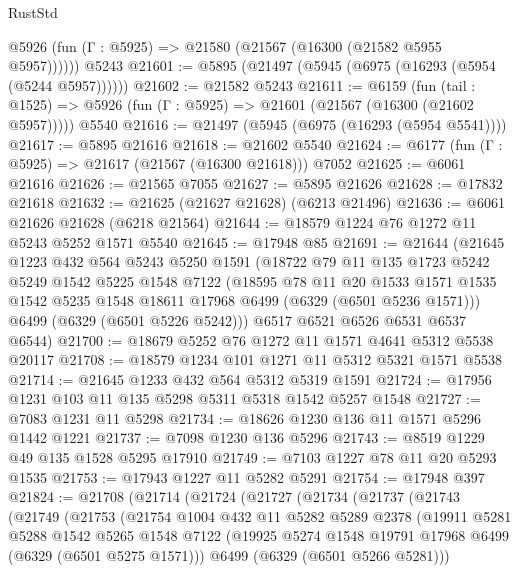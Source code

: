 \begin{lexlean}{RustStd}
\begin{coremodule}
{{      @5926 (fun (Γ : @5925) => @21580 (@21567 (@16300 (@21582 @5955 @5957))))))
    @5243
@21601 := @5895 (@21497 (@5945 (@6975 (@16293 (@5954 (@5244 @5957))))))
@21602 := @21582 @5243
@21611 := @6159
    (fun (tail : @1525) => @5926 (fun (Γ : @5925) => @21601 (@21567 (@16300 (@21602 @5957)))))
    @5540
@21616 := @21497 (@5945 (@6975 (@16293 (@5954 @5541))))
@21617 := @5895 @21616
@21618 := @21602 @5540
@21624 := @6177 (fun (Γ : @5925) => @21617 (@21567 (@16300 @21618))) @7052
@21625 := @6061 @21616
@21626 := @21565 @7055
@21627 := @5895 @21626
@21628 := @17832 @21618
@21632 := @21625 (@21627 @21628) (@6213 @21496)
@21636 := @6061 @21626 @21628 (@6218 @21564)
@21644 := @18579 @1224 @76 @1272 @11 @5243 @5252 @1571 @5540
@21645 := @17948 @85
@21691 := @21644
    (@21645
      @1223
      @432
      @564
      @5243
      @5250
      @1591
      (@18722
        @79
        @11
        @135
        @1723
        @5242
        @5249
        @1542
        @5225
        @1548
        @7122
        (@18595
          @78
          @11
          @20
          @1533
          @1571
          @1535
          @1542
          @5235
          @1548
          @18611
          @17968
          @6499
          (@6329 (@6501 @5236 @1571)))
        @6499
        (@6329 (@6501 @5226 @5242)))
      @6517
      @6521
      @6526
      @6531
      @6537
      @6544)
@21700 := @18679 @5252 @76 @1272 @11 @1571 @4641 @5312 @5538 @20117
@21708 := @18579 @1234 @101 @1271 @11 @5312 @5321 @1571 @5538
@21714 := @21645 @1233 @432 @564 @5312 @5319 @1591
@21724 := @17956 @1231 @103 @11 @135 @5298 @5311 @5318 @1542 @5257 @1548
@21727 := @7083 @1231 @11 @5298
@21734 := @18626 @1230 @136 @11 @1571 @5296 @1442 @1221
@21737 := @7098 @1230 @136 @5296
@21743 := @8519 @1229 @49 @135 @1528 @5295 @17910
@21749 := @7103 @1227 @78 @11 @20 @5293 @1535
@21753 := @17943 @1227 @11 @5282 @5291
@21754 := @17948 @397
@21824 := @21708
    (@21714
      (@21724
        (@21727
          (@21734
            (@21737
              (@21743
                (@21749
                  (@21753
                    (@21754
                      @1004
                      @432
                      @11
                      @5282
                      @5289
                      @2378
                      (@19911
                        @5281
                        @5288
                        @1542
                        @5265
                        @1548
                        @7122
                        (@19925 @5274 @1548 @19791 @17968 @6499 (@6329 (@6501 @5275 @1571)))
                        @6499
                        (@6329 (@6501 @5266 @5281)))
}}
\end{coremodule}
\end{lexlean}
